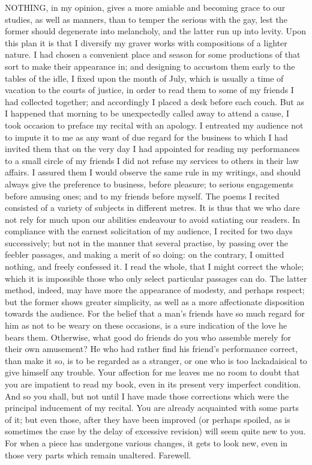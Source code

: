 NOTHING, in my opinion, gives a more amiable and becoming grace to our
studies, as well as manners, than to temper the serious with the gay, lest
the former should degenerate into melancholy, and the latter run up into
levity. Upon this plan it is that I diversify my graver works with
compositions of a lighter nature. I had chosen a convenient place and
season for some productions of that sort to make their appearance in; and
designing to accustom them early to the tables of the idle, I fixed upon
the month of July, which is usually a time of vacation to the courts of
justice, in order to read them to some of my friends I had collected
together; and accordingly I placed a desk before each couch. But as I
happened that morning to be unexpectedly called away to attend a cause, I
took occasion to preface my recital with an apology. I entreated my
audience not to impute it to me as any want of due regard for the business
to which I had invited them that on the very day I had appointed for
reading my performances to a small circle of my friends I did not refuse
my services to others in their law affairs. I assured them I would observe
the same rule in my writings, and should always give the preference to
business, before pleasure; to serious engagements before amusing ones; and
to my friends before myself. The poems I recited consisted of a variety of
subjects in different metres. It is thus that we who dare not rely for
much upon our abilities endeavour to avoid satiating our readers. In
compliance with the earnest solicitation of my audience, I recited for two
days successively; but not in the manner that several practise, by passing
over the feebler passages, and making a merit of so doing: on the
contrary, I omitted nothing, and freely confessed it. I read the whole,
that I might correct the whole; which it is impossible those who only
select particular passages can do. The latter method, indeed, may have
more the appearance of modesty, and perhaps respect; but the former shows
greater simplicity, as well as a more affectionate disposition towards the
audience. For the belief that a man's friends have so much regard for him
as not to be weary on these occasions, is a sure indication of the love he
bears them. Otherwise, what good do friends do you who assemble merely for
their own amusement? He who had rather find his friend's performance
correct, than make it so, is to be regarded as a stranger, or one who is
too lackadaisical to give himself any trouble. Your affection for me
leaves me no room to doubt that you are impatient to read my book, even in
its present very imperfect condition. And so you shall, but not until I
have made those corrections which were the principal inducement of my
recital. You are already acquainted with some parts of it; but even those,
after they have been improved (or perhaps spoiled, as is sometimes the
case by the delay of excessive revision) will seem quite new to you. For
when a piece has undergone various changes, it gets to look new, even in
those very parts which remain unaltered. Farewell.

